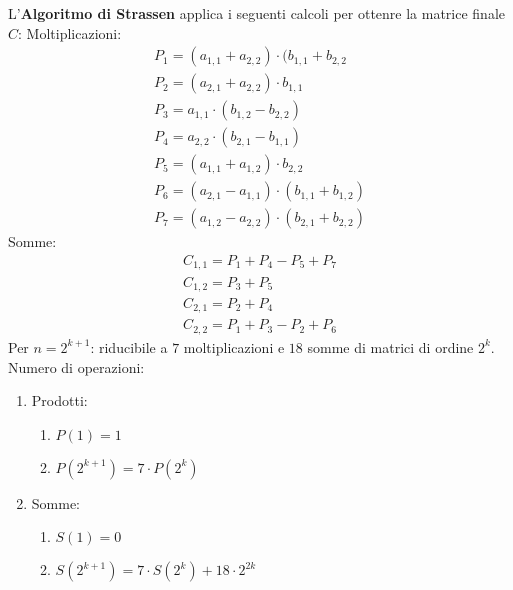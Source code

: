 L'\textbf{Algoritmo di Strassen} applica i seguenti calcoli per ottenre la matrice finale $C$:
Moltiplicazioni:
\begin{gather}
    P_1 = (a_{1,1} + a_{2,2})\cdot(b_{1,1} + b_{2,2} \\
    P_2 = (a_{2,1} + a_{2,2}) \cdot b_{1,1} \\
    P_3 = a_{1,1} \cdot (b_{1,2} - b_{2,2}) \\
    P_4 = a_{2,2} \cdot (b_{2,1} - b_{1,1}) \\
    P_5 = (a_{1,1} + a_{1,2}) \cdot b_{2,2} \\
    P_6 = (a_{2,1} - a_{1,1}) \cdot (b_{1,1} + b_{1,2}) \\
    P_7 = (a_{1,2} - a_{2,2}) \cdot (b_{2,1} + b_{2,2})
\end{gather}
Somme:
\begin{gather}
    C_{1,1} = P_1+P_4-P_5+P_7 \\
    C_{1,2} = P_3 + P_5 \\
    C_{2,1} = P_2 + P_4 \\
    C_{2,2} = P_1 + P_3 - P_2 + P_6
\end{gather}
Per $n = 2^{k+1}$: riducibile a $7$ moltiplicazioni e $18$ somme di matrici di ordine $2^k$. \\
Numero di operazioni: \begin{enumerate}
    \item Prodotti: \begin{enumerate}
        \item $P(1) = 1$ 
        \item $P(2^{k+1}) = 7 \cdot P(2^k)$
    \end{enumerate}
    \item Somme: \begin{enumerate}
        \item $S(1) = 0$
        \item $S(2^{k+1}) = 7 \cdot S(2^k) + 18 \cdot 2^{2k}$
    \end{enumerate}
\end{enumerate}